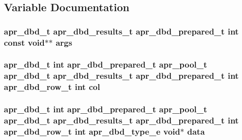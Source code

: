 \subsection{Variable Documentation}
\subsubsection[{\texorpdfstring{args}{args}}]{ {\bf apr\+\_\+dbd\+\_\+t} {\bf apr\+\_\+dbd\+\_\+results\+\_\+t} {\bf apr\+\_\+dbd\+\_\+prepared\+\_\+t} {\bf int} const {\bf void}$\ast$$\ast$ args}\hypertarget{group__APR__Util__DBD_ga6b6dfca544bdc17e0e73e3ca56c2363d}{}\label{group__APR__Util__DBD_ga6b6dfca544bdc17e0e73e3ca56c2363d}
\subsubsection[{\texorpdfstring{col}{col}}]{ {\bf apr\+\_\+dbd\+\_\+t} {\bf int} {\bf apr\+\_\+dbd\+\_\+prepared\+\_\+t} {\bf apr\+\_\+pool\+\_\+t} {\bf apr\+\_\+dbd\+\_\+t} {\bf apr\+\_\+dbd\+\_\+results\+\_\+t} {\bf apr\+\_\+dbd\+\_\+prepared\+\_\+t} {\bf int} {\bf apr\+\_\+dbd\+\_\+row\+\_\+t} {\bf int} col}\hypertarget{group__APR__Util__DBD_gae2d80c10d5136f660b76beaf704934f5}{}\label{group__APR__Util__DBD_gae2d80c10d5136f660b76beaf704934f5}
\subsubsection[{\texorpdfstring{data}{data}}]{ {\bf apr\+\_\+dbd\+\_\+t} {\bf int} {\bf apr\+\_\+dbd\+\_\+prepared\+\_\+t} {\bf apr\+\_\+pool\+\_\+t} {\bf apr\+\_\+dbd\+\_\+t} {\bf apr\+\_\+dbd\+\_\+results\+\_\+t} {\bf apr\+\_\+dbd\+\_\+prepared\+\_\+t} {\bf int} {\bf apr\+\_\+dbd\+\_\+row\+\_\+t} {\bf int} {\bf apr\+\_\+dbd\+\_\+type\+\_\+e} {\bf void}$\ast$ {\bf data}}\hypertarget{group__APR__Util__DBD_ga06de830a0219765bcda49e9ecfee4a09}{}\label{group__APR__Util__DBD_ga06de830a0219765bcda49e9ecfee4a09}
